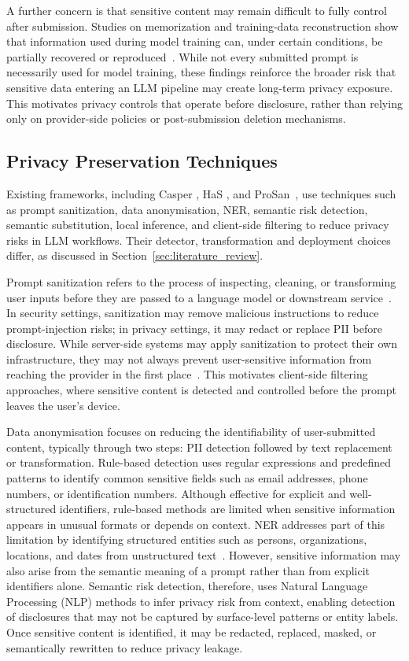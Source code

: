 \documentclass[conference]{IEEEtran}
\begin{document}
A further concern is that sensitive content may remain difficult to fully control after submission. Studies on memorization and training-data reconstruction show that information used during model training can, under certain conditions, be partially recovered or reproduced~\cite{haim2022reconstructing}. While not every submitted prompt is necessarily used for model training, these findings reinforce the broader risk that sensitive data entering an LLM pipeline may create long-term privacy exposure. This motivates privacy controls that operate before disclosure, rather than relying only on provider-side policies or post-submission deletion mechanisms.

\subsection{Privacy Preservation Techniques}

Existing frameworks, including Casper \cite{Casper2024}, HaS \cite{HaS2024}, and ProSan~\cite{ProSan2024}, use techniques such as prompt sanitization, data anonymisation, NER, semantic risk detection, semantic substitution, local inference, and client-side filtering to reduce privacy risks in LLM workflows. Their detector, transformation and deployment choices differ, as discussed in Section~\ref{sec:literature_review}.

Prompt sanitization refers to the process of inspecting, cleaning, or transforming user inputs before they are passed to a language model or downstream service~\cite{Mousumi_Bakshi2025}. In security settings, sanitization may remove malicious instructions to reduce prompt-injection risks; in privacy settings, it may redact or replace PII before disclosure. While server-side systems may apply sanitization to protect their own infrastructure, they may not always prevent user-sensitive information from reaching the provider in the first place~\cite{pradhan2025zero}. This motivates client-side filtering approaches, where sensitive content is detected and controlled before the prompt leaves the user's device.

Data anonymisation focuses on reducing the identifiability of user-submitted content, typically through two steps: PII detection followed by text replacement or transformation. Rule-based detection uses regular expressions and predefined patterns to identify common sensitive fields such as email addresses, phone numbers, or identification numbers. Although effective for explicit and well-structured identifiers, rule-based methods are limited when sensitive information appears in unusual formats or depends on context. NER addresses part of this limitation by identifying structured entities such as persons, organizations, locations, and dates from unstructured text~\cite{munnangi2024brief}. However, sensitive information may also arise from the semantic meaning of a prompt rather than from explicit identifiers alone. Semantic risk detection, therefore, uses Natural Language Processing (NLP) methods to infer privacy risk from context, enabling detection of disclosures that may not be captured by surface-level patterns or entity labels. Once sensitive content is identified, it may be redacted, replaced, masked, or semantically rewritten to reduce privacy leakage.
\end{document}
